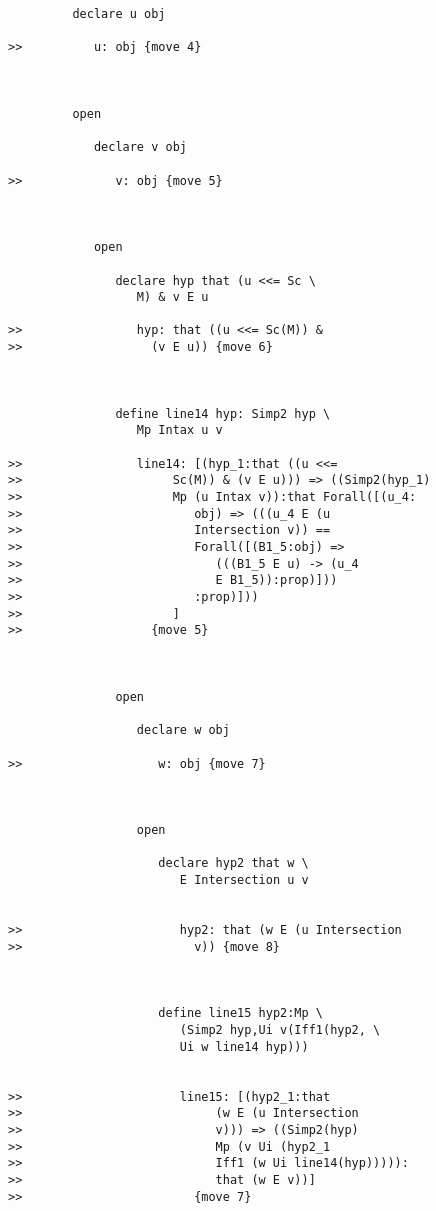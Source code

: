 \documentclass[12pt]{article}
\begin{document}
\begin{verbatim}
         declare u obj

>>          u: obj {move 4}



         open

            declare v obj

>>             v: obj {move 5}



            open

               declare hyp that (u <<= Sc \
                  M) & v E u

>>                hyp: that ((u <<= Sc(M)) &
>>                  (v E u)) {move 6}



               define line14 hyp: Simp2 hyp \
                  Mp Intax u v

>>                line14: [(hyp_1:that ((u <<=
>>                     Sc(M)) & (v E u))) => ((Simp2(hyp_1)
>>                     Mp (u Intax v)):that Forall([(u_4:
>>                        obj) => (((u_4 E (u
>>                        Intersection v)) ==
>>                        Forall([(B1_5:obj) =>
>>                           (((B1_5 E u) -> (u_4
>>                           E B1_5)):prop)]))
>>                        :prop)]))
>>                     ]
>>                  {move 5}



               open

                  declare w obj

>>                   w: obj {move 7}



                  open

                     declare hyp2 that w \
                        E Intersection u v


>>                      hyp2: that (w E (u Intersection
>>                        v)) {move 8}



                     define line15 hyp2:Mp \
                        (Simp2 hyp,Ui v(Iff1(hyp2, \
                        Ui w line14 hyp)))


>>                      line15: [(hyp2_1:that
>>                           (w E (u Intersection
>>                           v))) => ((Simp2(hyp)
>>                           Mp (v Ui (hyp2_1
>>                           Iff1 (w Ui line14(hyp))))):
>>                           that (w E v))]
>>                        {move 7}




\end{verbatim}
\end{document}
